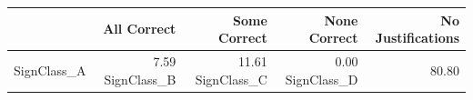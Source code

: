 \begin{tabular}{lrrrr}
\toprule
 & All Correct & Some Correct & None Correct & No Justifications \\
\midrule
SignClass_A & 7.59%
SignClass_B & 11.61%
SignClass_C & 0.00%
SignClass_D & 80.80%
\bottomrule
\end{tabular}
